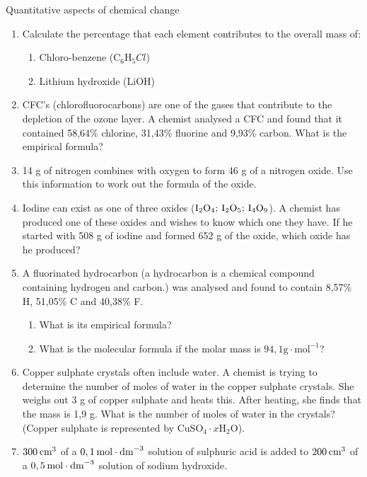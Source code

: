 \begin{eocexercises}{Quantitative aspects of chemical change}
\begin{enumerate}[noitemsep, label=\textbf{\arabic*}. ]
\item Calculate the percentage that each element contributes to the overall mass of:
\label{m38712*id6334}\begin{enumerate}[noitemsep, label=\textbf{\alph*}. ] 
            \item Chloro-benzene (${\text{C}}_{6}{\text{H}}_{5}Cl$)\item Lithium hydroxide ($\text{LiOH}$)\end{enumerate}
\item CFC's (chlorofluorocarbons) are one of the gases that contribute to the depletion of the ozone layer. A chemist analysed a CFC and found that it contained 58,64\% chlorine, 31,43\% fluorine and 9,93\% carbon. What is the empirical formula?\newline
\item 14 g of nitrogen combines with oxygen to form 46 g of a nitrogen oxide. Use this information to work out the formula of the oxide.\newline
            \item Iodine can exist as one of three oxides (${\text{I}}_{2}{\text{O}}_{4};\phantom{\rule{2pt}{0ex}}{\text{I}}_{2}{\text{O}}_{5};\phantom{\rule{2pt}{0ex}}{\text{I}}_{4}{\text{O}}_{9}$). A chemist has produced one of these oxides and wishes to know which one they have. If he started with 508 g of iodine and formed 652 g of the oxide, which oxide has he produced?\newline
            \item A fluorinated hydrocarbon (a hydrocarbon is a chemical compound containing hydrogen and carbon.) was analysed and found to contain 8,57\% H, 51,05\% C and 40,38\% F.\label{m38712*id73222}\begin{enumerate}[noitemsep, label=\textbf{\alph*}. ] 
            \item What is its empirical formula?\item What is the molecular formula if the molar mass is $94,1\text{g}\cdot {\text{mol}}^{-1}$?\end{enumerate}
                \item Copper sulphate crystals often include water. A chemist is trying to determine the number of moles of water in the copper sulphate crystals. She weighs out 3 g of copper sulphate and heats this. After heating, she finds that the mass is 1,9 g. What is the number of moles of water in the crystals? (Copper sulphate is represented by ${\text{CuSO}}_{4}\cdot x{\text{H}}_{2}\text{O}$).        \label{m38712*uid147}\item $300\phantom{\rule{2pt}{0ex}}{\text{cm}}^{3}$ of a $0,1\phantom{\rule{2pt}{0ex}}\text{mol}\ensuremath{\cdot}{\text{dm}}^{-3}$ solution of sulphuric acid is added to $200\phantom{\rule{2pt}{0ex}}{\text{cm}}^{3}$ of a $0,5\phantom{\rule{2pt}{0ex}}\text{mol}\ensuremath{\cdot}{\text{dm}}^{-3}$ solution of sodium hydroxide.

\end{enumerate}
\end{eocexercises}
